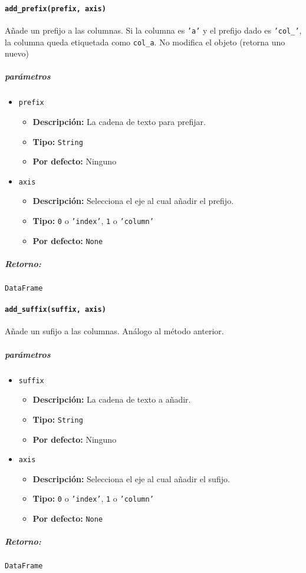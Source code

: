 \paragraph{\texttt{add\_prefix(prefix, axis)}} Añade un prefijo a las columnas.
Si la columna es \texttt{'a'} y el prefijo dado es \texttt{'col\_'}, la columna
queda etiquetada como \texttt{col\_a}. No modifica el objeto (retorna uno
nuevo)
\subparagraph{\textbf{parámetros}}
\begin{itemize}
    \item \texttt{prefix}
          \begin{itemize}
              \item \textbf{Descripción:} La cadena de texto para prefijar.
              \item \textbf{Tipo:} \texttt{String}
              \item \textbf{Por defecto:} Ninguno
          \end{itemize}
    \item \texttt{axis}
          \begin{itemize}
              \item \textbf{Descripción:} Selecciona el eje al cual añadir el
                    prefijo.
              \item \textbf{Tipo:}  \texttt{0} o \texttt{'index'}, \texttt{1} o
                    \texttt{'column'}
              \item \textbf{Por defecto:} \texttt{None}
          \end{itemize}
\end{itemize}
\subparagraph{Retorno:} \texttt{DataFrame}

\paragraph{\texttt{add\_suffix(suffix, axis)}} Añade un sufijo a las columnas.
Análogo al método anterior.
\subparagraph{\textbf{parámetros}}
\begin{itemize}
    \item \texttt{suffix}
          \begin{itemize}
              \item \textbf{Descripción:} La cadena de texto a añadir.
              \item \textbf{Tipo:} \texttt{String}
              \item \textbf{Por defecto:} Ninguno
          \end{itemize}
    \item \texttt{axis}
          \begin{itemize}
              \item \textbf{Descripción:} Selecciona el eje al cual añadir el
                    sufijo.
              \item \textbf{Tipo:} \texttt{0} o \texttt{'index'}, \texttt{1} o
                    \texttt{'column'}
              \item \textbf{Por defecto:} \texttt{None}
          \end{itemize}
\end{itemize}
\subparagraph{Retorno:} \texttt{DataFrame}

